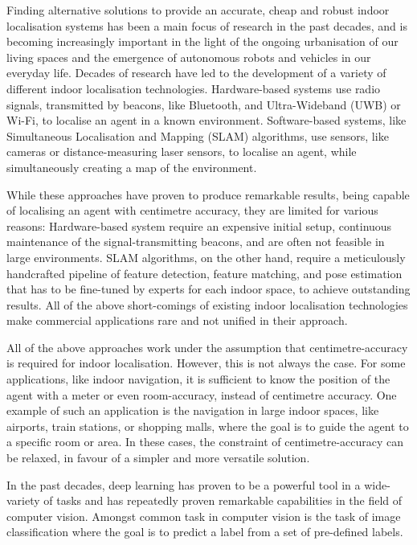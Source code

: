 \documentclass[a4paper]{article}
\begin{document}
  Finding alternative solutions to provide an accurate, cheap and robust indoor
  localisation systems has been a main focus of research in the past decades,
  and is becoming increasingly important in the light of the ongoing
  urbanisation of our living spaces and the emergence of autonomous robots and
  vehicles in our everyday life. Decades of research have led to the development
  of a variety of different indoor localisation technologies. Hardware-based
  systems use radio signals, transmitted by beacons, like Bluetooth, and
  Ultra-Wideband (UWB) or Wi-Fi, to localise an agent in a known environment.
  Software-based systems, like Simultaneous Localisation and Mapping (SLAM)
  algorithms, use sensors, like cameras or distance-measuring laser sensors, to
  localise an agent, while simultaneously creating a map of the environment.
  
  While these approaches have proven to produce remarkable results, being
  capable of localising an agent with centimetre accuracy, they are limited for
  various reasons: Hardware-based system require an expensive initial setup,
  continuous maintenance of the signal-transmitting beacons, and are often not
  feasible in large environments. SLAM algorithms, on the other hand, require a
  meticulously handcrafted pipeline of feature detection, feature matching, and
  pose estimation that has to be fine-tuned by experts for each indoor space, to
  achieve outstanding results. All of the above short-comings of existing indoor
  localisation technologies make commercial applications rare and not unified in
  their approach. 

  All of the above approaches work under the assumption that centimetre-accuracy
  is required for indoor localisation. However, this is not always the case. For
  some applications, like indoor navigation, it is sufficient to know the
  position of the agent with a meter or even room-accuracy, instead of
  centimetre accuracy. One example of such an application is the navigation in
  large indoor spaces, like airports, train stations, or shopping malls, where
  the goal is to guide the agent to a specific room or area. In these cases, the
  constraint of centimetre-accuracy can be relaxed, in favour of a simpler and
  more versatile solution.

  In the past decades, deep learning has proven to be a powerful tool in a
  wide-variety of tasks and has repeatedly proven remarkable capabilities in the
  field of computer vision. Amongst common task in computer vision is the task
  of image classification where the goal is to predict a label from a set of
  pre-defined labels.
\end{document}

